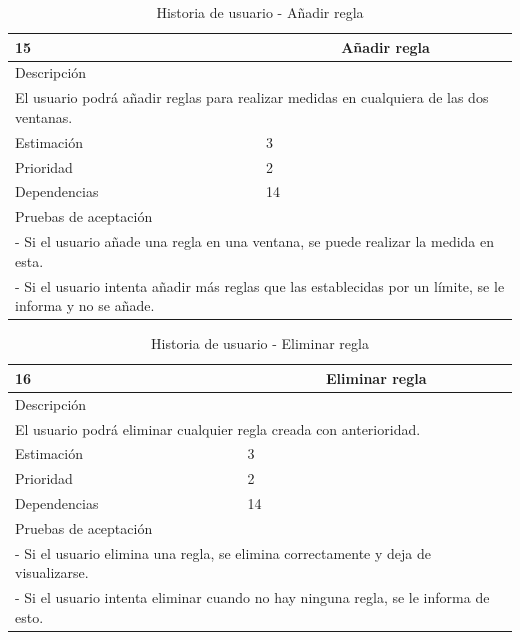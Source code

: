 \begin{table}[H]
	\begin{center}
		\begin{tabular} {|l|c|l|}
			\hline
			15 & \multicolumn{2}{c|}{Añadir regla} \\ \hline \hline
			\multicolumn{3}{|l|}{Descripción} \\ \hline
			\multicolumn{3}{|p{12cm}|}{El usuario podrá añadir reglas para realizar medidas en cualquiera de las dos ventanas.} \\ \hline
			\multicolumn{2}{|l|}{Estimación} & 3 \\ \hline
			\multicolumn{2}{|l|}{Prioridad} & 2 \\ \hline
			\multicolumn{2}{|l|}{Dependencias} & 14 \\ \hline
			\multicolumn{3}{|l|}{Pruebas de aceptación} \\ \hline
			\multicolumn{3}{|p{12cm}|}{ - Si el usuario añade una regla en una ventana, se puede realizar la medida en esta.} \\
			\multicolumn{3}{|p{12cm}|}{ - Si el usuario intenta añadir más reglas que las establecidas por un límite, se le informa y no se añade.} \\ \hline
		\end{tabular}
	\end{center}
	\caption{Historia de usuario - Añadir regla}
	\label{tab:hu_anadir_regla}
\end{table}

\begin{table}[H]
	\begin{center}
		\begin{tabular} {|l|c|l|}
			\hline
			16 & \multicolumn{2}{c|}{Eliminar regla} \\ \hline \hline
			\multicolumn{3}{|l|}{Descripción} \\ \hline
			\multicolumn{3}{|p{12cm}|}{El usuario podrá eliminar cualquier regla creada con anterioridad.} \\ \hline
			\multicolumn{2}{|l|}{Estimación} & 3 \\ \hline
			\multicolumn{2}{|l|}{Prioridad} & 2 \\ \hline
			\multicolumn{2}{|l|}{Dependencias} & 14 \\ \hline
			\multicolumn{3}{|l|}{Pruebas de aceptación} \\ \hline
			\multicolumn{3}{|p{12cm}|}{ - Si el usuario elimina una regla, se elimina correctamente y deja de visualizarse.} \\
			\multicolumn{3}{|p{12cm}|}{ - Si el usuario intenta eliminar cuando no hay ninguna regla, se le informa de esto.} \\ \hline
		\end{tabular}
	\end{center}
	\caption{Historia de usuario - Eliminar regla}
	\label{tab:hu_eliminar_regla}
\end{table}

